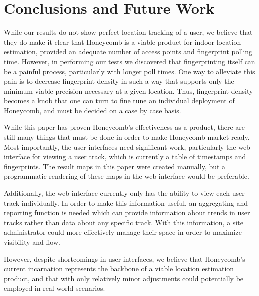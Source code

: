 \chapter{Conclusions and Future Work}
\label{discussion}
%


While our results do not show perfect location tracking of a user, we believe that they do make it clear that Honeycomb is a viable product for indoor location estimation, provided an adequate number of access points and fingerprint polling time. However, in performing our tests we discovered that fingerprinting itself can be a painful process, particularly with longer poll times. One way to alleviate this pain is to decrease fingerprint density in such a way that supports only the minimum viable precision necessary at a given location. Thus, fingerprint density becomes a knob that one can turn to fine tune an individual deployment of Honeycomb, and must be decided on a case by case basis. 

While this paper has proven Honeycomb's effectiveness as a product, there are still many things that must be done in order to make Honeycomb market ready. Most importantly, the user interfaces need significant work, particularly the web interface for viewing a user track, which is currently a table of timestamps and fingerprints. The result maps in this paper were created manually, but a programmatic rendering of these maps in the web interface would be preferable. 

Additionally, the web interface currently only has the ability to view each user track individually. In order to make this information useful, an aggregating and reporting function is needed which can provide information about trends in user tracks rather than data about any specific track. With this information, a site administrator could more effectively manage their space in order to maximize visibility and flow. 

However, despite shortcomings in user interfaces, we believe that Honeycomb's current incarnation represents the backbone of a viable location estimation product, and that with only relatively minor adjustments could potentially be employed in real world scenarios. 